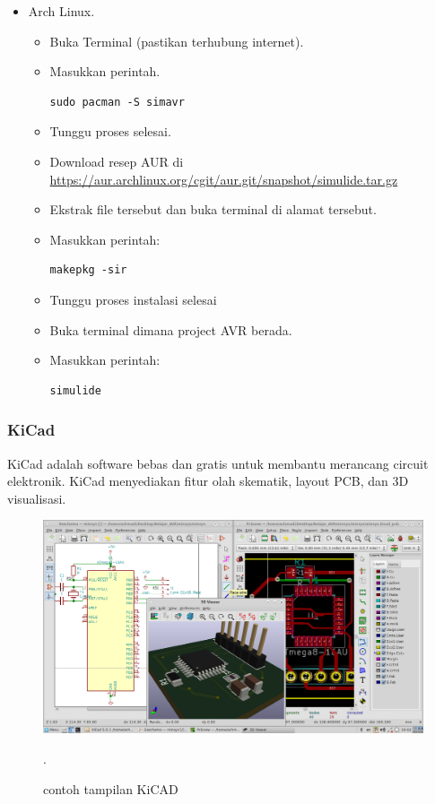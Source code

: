 \documentclass[12pt,]{article}
\begin{document}
\begin{itemize}
		\item Arch Linux.
		\begin{itemize}
			\item Buka Terminal (pastikan terhubung internet).
			\item Masukkan perintah.
			\begin{verbatim}
sudo pacman -S simavr
			\end{verbatim}
			\item Tunggu proses selesai.
			\item Download resep AUR di \url{https://aur.archlinux.org/cgit/aur.git/snapshot/simulide.tar.gz}
			\item Ekstrak file tersebut dan buka terminal di alamat tersebut.
			\item Masukkan perintah:
			\begin{verbatim}
makepkg -sir
			\end{verbatim}
			\item Tunggu proses instalasi selesai
			\item Buka terminal dimana project AVR berada.
			\item Masukkan perintah:
			\begin{verbatim}
simulide
			\end{verbatim}
		\end{itemize}
		
	\end{itemize}

	\subsubsection{KiCad}
	KiCad adalah software bebas dan gratis untuk membantu merancang circuit elektronik.
	KiCad menyediakan fitur olah skematik, layout PCB, dan 3D visualisasi.
	
	\begin{figure}[H]
		\centering
		\includegraphics[width=0.6\linewidth]{images/kicad}
		\caption{contoh tampilan KiCAD}.
	\end{figure}
\end{document}
